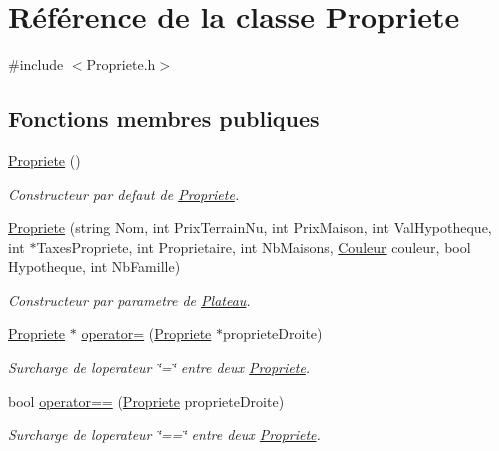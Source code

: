 \hypertarget{classPropriete}{}\section{Référence de la classe Propriete}
\label{classPropriete}


{\ttfamily \#include $<$Propriete.\+h$>$}

\subsection*{Fonctions membres publiques}
\begin{DoxyCompactItemize}
\item 
\hyperlink{classPropriete_a0ad3dee14b2e7c5c6b0f5e3f9bd6fb69}{Propriete} ()
\begin{DoxyCompactList}\small\item\em Constructeur par defaut de \hyperlink{classPropriete}{Propriete}. \end{DoxyCompactList}\item 
\hyperlink{classPropriete_a8a8eba0f92fcc745ca4caf3868a910c1}{Propriete} (string Nom, int Prix\+Terrain\+Nu, int Prix\+Maison, int Val\+Hypotheque, int $\ast$Taxes\+Propriete, int Proprietaire, int Nb\+Maisons, \hyperlink{classCouleur}{Couleur} couleur, bool Hypotheque, int Nb\+Famille)
\begin{DoxyCompactList}\small\item\em Constructeur par parametre de \hyperlink{classPlateau}{Plateau}. \end{DoxyCompactList}\item 
\hyperlink{classPropriete}{Propriete} $\ast$ \hyperlink{classPropriete_a3ba09ae6e32e9010ecc1742e2a0d998a}{operator=} (\hyperlink{classPropriete}{Propriete} $\ast$propriete\+Droite)
\begin{DoxyCompactList}\small\item\em Surcharge de l\textquotesingle{}operateur \char`\"{}=\char`\"{} entre deux \hyperlink{classPropriete}{Propriete}. \end{DoxyCompactList}\item 
bool \hyperlink{classPropriete_a9e0f646038795f211129a3005079523b}{operator==} (\hyperlink{classPropriete}{Propriete} propriete\+Droite)
\begin{DoxyCompactList}\small\item\em Surcharge de l\textquotesingle{}operateur \char`\"{}==\char`\"{} entre deux \hyperlink{classPropriete}{Propriete}. \end{DoxyCompactList}\item 

\end{DoxyCompactItemize}
